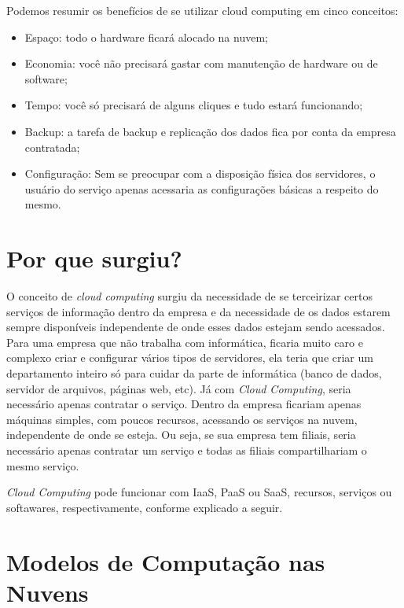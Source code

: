 \documentclass{abnt}
\begin{document}
	Podemos resumir os benefícios de se utilizar cloud computing em cinco conceitos:

    \begin{itemize}

        \item Espaço: todo o hardware ficará alocado na nuvem;

        \item Economia: você não precisará gastar com manutenção de hardware ou de software;

        \item Tempo: você só precisará de alguns cliques e tudo estará funcionando;

        \item Backup: a tarefa de backup e replicação dos dados fica por conta da empresa contratada;

        \item Configuração: Sem se preocupar com a disposição física dos servidores, 
        o usuário do serviço apenas acessaria as configurações básicas a respeito do mesmo.

    \end{itemize}

	\chapter{Por que surgiu?}

	O conceito de \textit{cloud computing} surgiu da necessidade de se terceirizar certos serviços 
	de informação dentro da empresa e da necessidade de os dados estarem sempre disponíveis 
	independente de onde esses dados estejam sendo acessados. Para uma empresa que não trabalha 
	com informática, ficaria muito caro e complexo criar e configurar vários tipos de servidores, 
	ela teria que criar um departamento inteiro só para cuidar da parte de informática 
	(banco de dados, servidor de arquivos, páginas web, etc). Já com \textit{Cloud Computing}, seria 
	necessário apenas contratar o serviço. Dentro da empresa ficariam apenas máquinas simples, 
	com poucos recursos, acessando os serviços na nuvem, independente de onde se esteja. Ou seja, 
	se sua empresa tem filiais, seria necessário apenas contratar um serviço e todas as filiais 
	compartilhariam o mesmo serviço. 

	\textit{Cloud Computing} pode funcionar com IaaS, PaaS ou SaaS, recursos, serviços ou softawares, 
	respectivamente, conforme explicado a seguir.

	\chapter{Modelos de Computação nas Nuvens}
\end{document}
